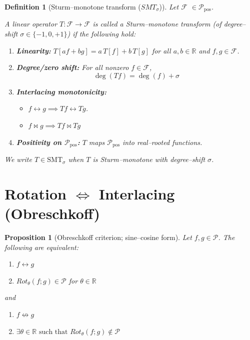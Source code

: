 \documentclass[11pt]{article}
\theoremstyle{breakdef}
\newtheorem{definition}[theorem]{Definition}
\newtheorem{proposition}[theorem]{Proposition}
\begin{document}
\begin{definition}[Sturm--monotone transform ($SMT_{\sigma}$)]
Let $\mathcal{F}$ $\in \mathcal P_{\mathrm{pos}}$.

A linear operator $T:\mathcal{F}\to\mathcal{F}$ is called a \emph{Sturm--monotone transform}
(of degree--shift $\sigma\in\{-1,0,+1\}$) if the following hold:
\begin{enumerate}
\item \textbf{Linearity:} $T[af+bg]=a\,T[f]+b\,T[g]$ for all $a,b\in\mathbb{R}$ and $f,g\in\mathcal{F}$.
\item \textbf{Degree/zero shift:} For all nonzero $f\in\mathcal{F}$,
\[
\deg(Tf)=\deg(f)+\sigma 
\]
\item \textbf{Interlacing monotonicity:}
\begin{itemize}

\item  $f \leftrightarrow g \implies T f \leftrightarrow T g$.
\item  $f \bowtie g \implies T f \bowtie T g$ 
\end{itemize}
\item \textbf{Positivity on $\mathcal P_{\mathrm{pos}}$:} $T$ maps $\mathcal P_{\mathrm{pos}}$ into real--rooted functions.
\end{enumerate}
We write $T\in\mathrm{SMT}_\sigma$ when $T$ is Sturm--monotone with degree--shift $\sigma$.
\end{definition}

\section{Rotation $\Longleftrightarrow$ Interlacing (Obreschkoff)}
\begin{proposition}[Obreschkoff criterion; sine--cosine form]\label{prop:obreschkoff}
Let $f,g\in\mathcal{P}$. The following are equivalent:

\begin{enumerate}
  \item $f\leftrightarrow g$
  \item $Rot_\theta(f;g) \in\mathcal{P}$ for $\theta \in \mathbb{R} $ 
\end{enumerate}

and

\begin{enumerate}
\item $f \not\leftrightarrow g$
\item $\exists \theta \in \mathbb{R} \text{ such that } Rot_\theta(f;g) \notin \mathcal{P}$
\end{enumerate}

\end{proposition}
\end{document}
